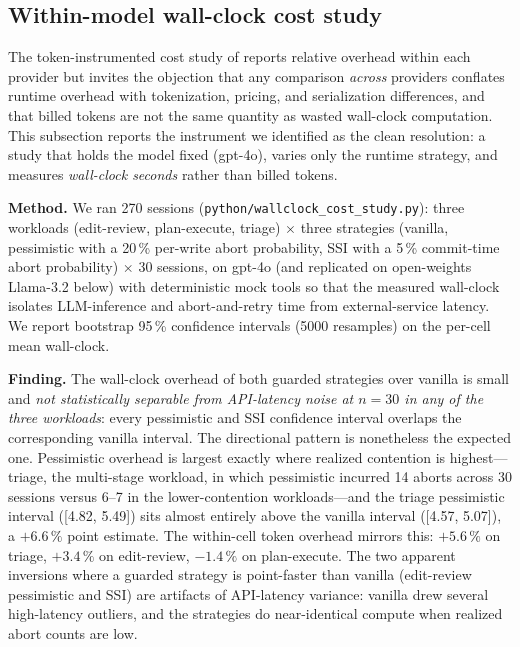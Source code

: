 \documentclass[journal,compsoc,10pt]{IEEEtran}
\theoremstyle{definition}
\theoremstyle{remark}
\begin{document}
\subsection{Within-model wall-clock cost study}
\label{sec:wallclock}

The token-instrumented cost study of 
reports relative overhead within each provider but invites the
objection that any comparison \emph{across} providers conflates
runtime overhead with tokenization, pricing, and serialization
differences, and that billed tokens are not the same quantity as
wasted wall-clock computation. This subsection reports the
instrument we identified as the clean resolution: a study that
holds the model fixed (gpt-4o), varies only the runtime
strategy, and measures \emph{wall-clock seconds} rather than
billed tokens.

\medskip
\noindent\textbf{Method.}
We ran 270 sessions
(\texttt{python/wallclock\_cost\_study.py}): three workloads
(edit-review, plan-execute, triage) $\times$ three strategies
(vanilla, pessimistic with a 20\,\% per-write abort probability,
SSI with a 5\,\% commit-time abort probability) $\times$ 30
sessions, on gpt-4o (and replicated on open-weights Llama-3.2 below) with
deterministic mock tools so that
the measured wall-clock isolates LLM-inference and
abort-and-retry time from external-service latency. We report
bootstrap 95\,\% confidence intervals (5000 resamples) on the
per-cell mean wall-clock.


\medskip
\noindent\textbf{Finding.}
The wall-clock overhead of both guarded strategies over vanilla
is small and \emph{not statistically separable from
API-latency noise at $n=30$ in any of the three workloads}:
every pessimistic and SSI confidence interval overlaps the
corresponding vanilla interval. The directional pattern is
nonetheless the expected one. Pessimistic overhead is largest
exactly where realized contention is highest---triage, the
multi-stage workload, in which pessimistic incurred 14 aborts
across 30 sessions versus 6--7 in the lower-contention
workloads---and the triage pessimistic interval ([4.82, 5.49])
sits almost entirely above the vanilla interval ([4.57, 5.07]),
a $+6.6\,\%$ point estimate. The within-cell token overhead
mirrors this: $+5.6\,\%$ on triage, $+3.4\,\%$ on edit-review,
$-1.4\,\%$ on plan-execute. The two apparent inversions where a
guarded strategy is point-faster than vanilla (edit-review
pessimistic and SSI) are artifacts of API-latency variance:
vanilla drew several high-latency outliers, and the strategies
do near-identical compute when realized abort counts are low.
\end{document}
